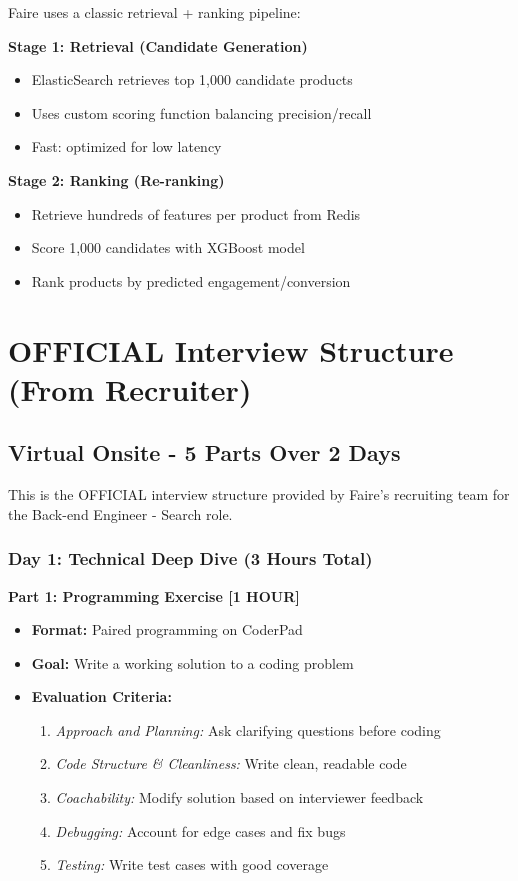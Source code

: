 \documentclass[11pt,letterpaper]{article}
\begin{document}
Faire uses a classic retrieval + ranking pipeline:

\textbf{Stage 1: Retrieval (Candidate Generation)}
\begin{itemize}
    \item ElasticSearch retrieves top 1,000 candidate products
    \item Uses custom scoring function balancing precision/recall
    \item Fast: optimized for low latency
\end{itemize}

\textbf{Stage 2: Ranking (Re-ranking)}
\begin{itemize}
    \item Retrieve hundreds of features per product from Redis
    \item Score 1,000 candidates with XGBoost model
    \item Rank products by predicted engagement/conversion
\end{itemize}

\section{OFFICIAL Interview Structure (From Recruiter)}

\subsection{Virtual Onsite - 5 Parts Over 2 Days}

This is the OFFICIAL interview structure provided by Faire's recruiting team for the Back-end Engineer - Search role.

\subsubsection{Day 1: Technical Deep Dive (3 Hours Total)}

\textbf{Part 1: Programming Exercise [1 HOUR]}
\begin{itemize}
    \item \textbf{Format:} Paired programming on CoderPad
    \item \textbf{Goal:} Write a working solution to a coding problem
    \item \textbf{Evaluation Criteria:}
    \begin{enumerate}
        \item \textit{Approach and Planning:} Ask clarifying questions before coding
        \item \textit{Code Structure \& Cleanliness:} Write clean, readable code
        \item \textit{Coachability:} Modify solution based on interviewer feedback
        \item \textit{Debugging:} Account for edge cases and fix bugs
        \item \textit{Testing:} Write test cases with good coverage
    \end{enumerate}
\end{itemize}
\end{document}
